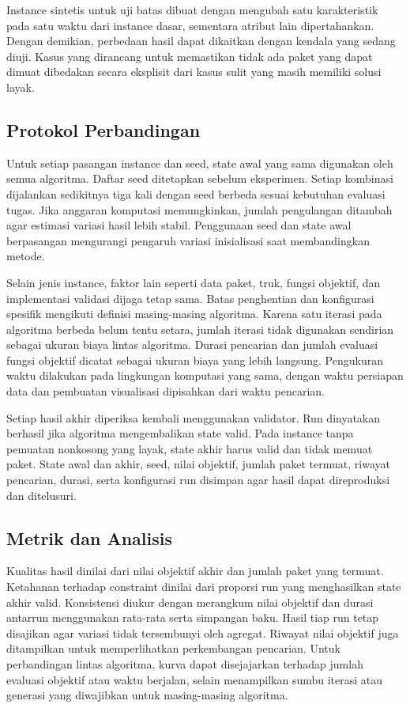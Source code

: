 Instance sintetis untuk uji batas dibuat dengan mengubah satu karakteristik pada satu waktu dari instance dasar, sementara atribut lain dipertahankan. Dengan demikian, perbedaan hasil dapat dikaitkan dengan kendala yang sedang diuji. Kasus yang dirancang untuk memastikan tidak ada paket yang dapat dimuat dibedakan secara eksplisit dari kasus sulit yang masih memiliki solusi layak.

\subsection{Protokol Perbandingan}

Untuk setiap pasangan instance dan seed, state awal yang sama digunakan oleh semua algoritma. Daftar seed ditetapkan sebelum eksperimen. Setiap kombinasi dijalankan sedikitnya tiga kali dengan seed berbeda sesuai kebutuhan evaluasi tugas. Jika anggaran komputasi memungkinkan, jumlah pengulangan ditambah agar estimasi variasi hasil lebih stabil. Penggunaan seed dan state awal berpasangan mengurangi pengaruh variasi inisialisasi saat membandingkan metode.

Selain jenis instance, faktor lain seperti data paket, truk, fungsi objektif, dan implementasi validasi dijaga tetap sama. Batas penghentian dan konfigurasi spesifik mengikuti definisi masing-masing algoritma. Karena satu iterasi pada algoritma berbeda belum tentu setara, jumlah iterasi tidak digunakan sendirian sebagai ukuran biaya lintas algoritma. Durasi pencarian dan jumlah evaluasi fungsi objektif dicatat sebagai ukuran biaya yang lebih langsung. Pengukuran waktu dilakukan pada lingkungan komputasi yang sama, dengan waktu persiapan data dan pembuatan visualisasi dipisahkan dari waktu pencarian.

Setiap hasil akhir diperiksa kembali menggunakan validator. Run dinyatakan berhasil jika algoritma mengembalikan state valid. Pada instance tanpa pemuatan nonkosong yang layak, state akhir harus valid dan tidak memuat paket. State awal dan akhir, seed, nilai objektif, jumlah paket termuat, riwayat pencarian, durasi, serta konfigurasi run disimpan agar hasil dapat direproduksi dan ditelusuri.

\subsection{Metrik dan Analisis}

Kualitas hasil dinilai dari nilai objektif akhir dan jumlah paket yang termuat. Ketahanan terhadap constraint dinilai dari proporsi run yang menghasilkan state akhir valid. Konsistensi diukur dengan merangkum nilai objektif dan durasi antarrun menggunakan rata-rata serta simpangan baku. Hasil tiap run tetap disajikan agar variasi tidak tersembunyi oleh agregat. Riwayat nilai objektif juga ditampilkan untuk memperlihatkan perkembangan pencarian. Untuk perbandingan lintas algoritma, kurva dapat disejajarkan terhadap jumlah evaluasi objektif atau waktu berjalan, selain menampilkan sumbu iterasi atau generasi yang diwajibkan untuk masing-masing algoritma.


